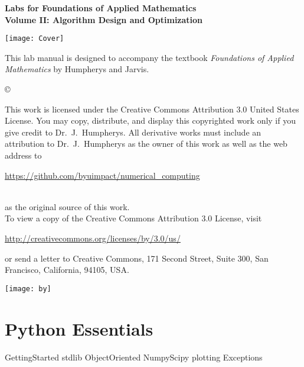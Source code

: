 \documentclass[nociteref]{SIAM-GH-book}
\begin{document}

\thispagestyle{empty} %

\begin{center}
{\huge \bf Labs for Foundations of Applied Mathematics} \\
\vspace{5mm}
{\Large \bf Volume II: Algorithm Design and Optimization}
\vspace{20mm}

\texttt{[image: Cover]}
\end{center}
\frontmatter



\begin{thepreface} %

This lab manual is designed to accompany the textbook \emph{Foundations of Applied Mathematics} by Humpherys and Jarvis.

\vfill
\copyright{This work is licensed under the Creative Commons Attribution 3.0 United States
License.  You may copy, distribute, and display this copyrighted work only if you give
credit to Dr.~J.~Humpherys. All derivative works must include an attribution to Dr.~J.~Humpherys as the owner of this work as well as the web address to
\\\centerline{\url{https://github.com/byuimpact/numerical_computing}}\\ as the original source of
this
work.\\To view a copy of the Creative Commons Attribution 3.0 License,
visit\\\centerline{\url{http://creativecommons.org/licenses/by/3.0/us/}} or send a letter to
Creative Commons, 171 Second Street, Suite 300, San Francisco, California, 94105, USA.}

\vfill
\centering\texttt{[image: by]}
\vfill
\end{thepreface}

\setcounter{tocdepth}{1}
\tableofcontents

\mainmatter


\part{Python Essentials}
{GettingStarted}
{stdlib}
{ObjectOriented}
{NumpyScipy}
{plotting}
{Exceptions}
\end{document}
